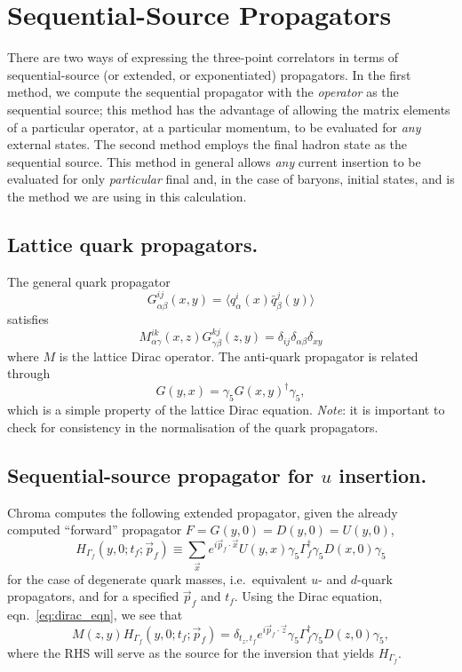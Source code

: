 \documentclass[12pt]{article}
\newcommand{\pfdotx}{\vec{p}_f \cdot \vec{x}}
\newcommand{\pfdotz}{\vec{p}_f \cdot \vec{z}}
\begin{document}
\section{Sequential-Source Propagators}
There are two ways of expressing the three-point correlators in terms
of sequential-source (or extended, or exponentiated) propagators.  In
the first method, we compute the sequential propagator with the
\textit{operator} as the sequential source; this method has the
advantage of allowing the matrix elements of a particular operator, at
a particular momentum, to be evaluated for \textit{any} external
states.  The second method employs the final hadron state as the
sequential source.  This method in general allows \textit{any} current
insertion to be evaluated for only \textit{particular} final and, in
the case of baryons, initial states, and is the method we are using in
this calculation.

\subsection{Lattice quark propagators.}
The general quark propagator
\begin{equation}
G^{ij}_{\alpha\beta}(x,y) = \langle q^i_{\alpha}(x)
\bar{q}^j_{\beta}(y)\rangle
\end{equation}
satisfies
\begin{equation}
M^{ik}_{\alpha\gamma}(x,z) G^{kj}_{\gamma\beta}(z,y) = \delta_{ij}
\delta_{\alpha \beta} \delta_{xy}\label{eq:dirac_eqn}
\end{equation}
where $M$ is the lattice Dirac operator.  The anti-quark propagator
is related through
\begin{equation}
G(y,x) = \gamma_5 G(x,y)^{\dagger} \gamma_5,\label{eq:anti_quark}
\end{equation}
which is a simple property of the lattice Dirac equation.
\textit{Note}: it is important to check for consistency in the
normalisation of the quark propagators.

\subsection{Sequential-source propagator for $u$ insertion.}
Chroma computes the following extended propagator, given the already
computed ``forward'' propagator $F=G(y,0)=D(y,0)=U(y,0)$,
\begin{equation}
H_{\Gamma_f}(y,0; t_f; \vec{p}_f) \equiv \sum_{\vec{x}} e^{i \pfdotx} U(y,x) \gamma_5 \Gamma_f^\dag \gamma_5 D(x,0) \gamma_5\label{eq:u_insert}
\end{equation}
for the case of degenerate quark masses, i.e.\ equivalent $u$- and
$d$-quark propagators, and for a specified $\vec{p}_f$ and $t_f$.  Using
the Dirac equation, eqn.~\ref{eq:dirac_eqn}, we see that
\begin{equation}
M(z,y) H_{\Gamma_f}(y,0; t_f; \vec{p}_f) = \delta_{t_z, t_f} e^{i
  \pfdotz} \gamma_5 \Gamma_f^\dag \gamma_5 D(z,0) \gamma_5,
  \label{eq:dirac_u_insert}
\end{equation}
where the RHS will serve as the source for the inversion that yields
$H_{\Gamma_f}$.
\end{document}
